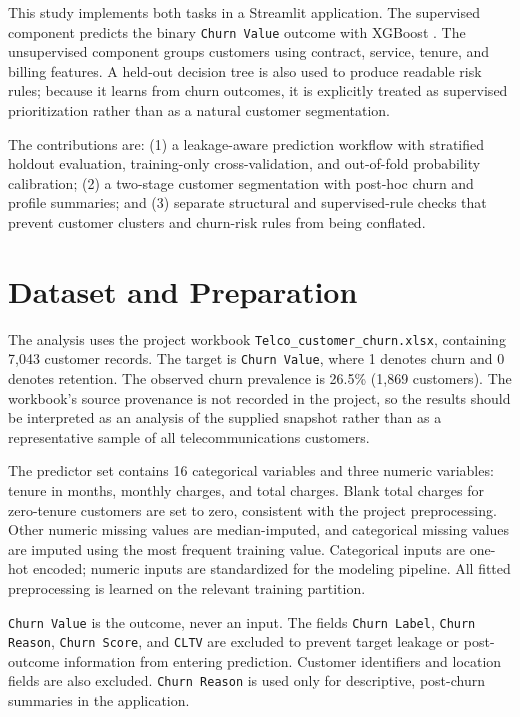 \documentclass[conference]{IEEEtran}
\begin{document}
This study implements both tasks in a Streamlit application. The supervised component predicts the binary \texttt{Churn Value} outcome with XGBoost \cite{chen2016xgboost}. The unsupervised component groups customers using contract, service, tenure, and billing features. A held-out decision tree is also used to produce readable risk rules; because it learns from churn outcomes, it is explicitly treated as supervised prioritization rather than as a natural customer segmentation.

The contributions are: (1) a leakage-aware prediction workflow with stratified holdout evaluation, training-only cross-validation, and out-of-fold probability calibration; (2) a two-stage customer segmentation with post-hoc churn and profile summaries; and (3) separate structural and supervised-rule checks that prevent customer clusters and churn-risk rules from being conflated.

\section{Dataset and Preparation}
The analysis uses the project workbook \texttt{Telco\_customer\_churn.xlsx}, containing 7,043 customer records. The target is \texttt{Churn Value}, where 1 denotes churn and 0 denotes retention. The observed churn prevalence is 26.5\% (1,869 customers). The workbook's source provenance is not recorded in the project, so the results should be interpreted as an analysis of the supplied snapshot rather than as a representative sample of all telecommunications customers.

The predictor set contains 16 categorical variables and three numeric variables: tenure in months, monthly charges, and total charges. Blank total charges for zero-tenure customers are set to zero, consistent with the project preprocessing. Other numeric missing values are median-imputed, and categorical missing values are imputed using the most frequent training value. Categorical inputs are one-hot encoded; numeric inputs are standardized for the modeling pipeline. All fitted preprocessing is learned on the relevant training partition.

\texttt{Churn Value} is the outcome, never an input. The fields \texttt{Churn Label}, \texttt{Churn Reason}, \texttt{Churn Score}, and \texttt{CLTV} are excluded to prevent target leakage or post-outcome information from entering prediction. Customer identifiers and location fields are also excluded. \texttt{Churn Reason} is used only for descriptive, post-churn summaries in the application.
\end{document}
